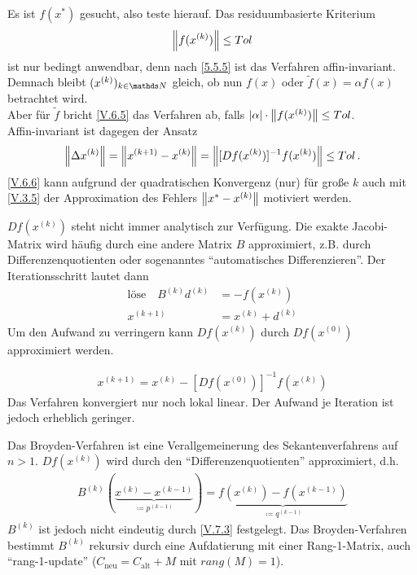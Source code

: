 Es ist $f(x^{*})$ gesucht, also teste hierauf. Das residuumbasierte Kriterium
\begin{gather}
  \left\| f(x^{(k)}) \right\|\leq Tol
  \label{V.6.5}
\end{gather}
ist nur bedingt anwendbar, denn nach \ref{5.5.5} ist das Verfahren affin-invariant.
Demnach bleibt $(x^{(k)})_{k\in\N}$ gleich,
ob nun $f(x)$ oder $\widetilde{f}(x) =\alpha f(x) $ betrachtet wird.\\
Aber für $\widetilde{f}$ bricht \eqref{V.6.5} das Verfahren ab, 
falls $|\alpha|\cdot \left\| f(x^{(k)}) \right\| \leq Tol$. \\
Affin-invariant ist dagegen der Ansatz
\begin{gather}
  \left\| \Delta x^{(k)} \right\|= \left\| x^{(k+1)}-x^{(k)} \right\| 
  = \left\| [Df(x^{(k)})]^{-1}f(x^{(k)}) \right\| 
  \leq Tol \, .
  \label{V.6.6}
\end{gather}
\eqref{V.6.6} kann aufgrund der quadratischen Konvergenz (nur) für 
große $k$ auch mit \eqref{V.3.5} der Approximation des Fehlers 
$\left\| x^{*}-x^{(k)} \right\| $ motiviert werden.


$Df(x^{(k)})$ steht nicht immer analytisch zur Verfügung.
Die exakte Jacobi-Matrix wird häufig durch eine andere Matrix $B$ approximiert, 
z.B. durch Differenzenquotienten oder sogenanntes
\enquote{automatisches Differenzieren}.
Der Iterationsschritt lautet dann
\begin{align}
  \text{löse}\quad B^{(k)}d^{(k)} &= -f(x^{(k)}) 
                                    \label{V.7.1} \\\nonumber
  x^{(k+1)} &=x^{(k)} + d^{(k)}
\end{align}
Um den Aufwand zu verringern kann $Df(x^{(k)})$ durch
$Df(x^{(0)})$ approximiert werden.


\begin{gather}
  x^{(k+1)} = x^{(k)} -[Df(x^{(0)})]^{-1} f(x^{(k)})
  \label{V.7.2}
\end{gather}
Das Verfahren konvergiert nur noch lokal linear.
Der Aufwand je Iteration ist jedoch erheblich geringer.



Das Broyden-Verfahren ist eine Verallgemeinerung des Sekantenverfahrens
auf $n>1$. $Df(x^{(k)})$ wird durch den
\enquote{Differenzenquotienten} approximiert, d.h.
\begin{gather}
  B^{(k)}(\underbrace{x^{(k)}-x^{(k-1)}}_{\coloneqq p^{(k-1)}})
  = \underbrace{f(x^{(k)})-f(x^{(k-1)})}_{\coloneqq
    q^{(k-1)}}
  \label{V.7.3}
\end{gather}
$B^{(k)}$ ist jedoch nicht eindeutig durch \eqref{V.7.3} festgelegt.
Das Broyden-Verfahren bestimmt $B^{(k)}$ rekursiv durch eine 
Aufdatierung mit einer Rang-1-Matrix, auch \enquote{rang-1-update}
($C_\text{neu} = C_\text{alt} +M$ mit $rang(M)=1$). \\

